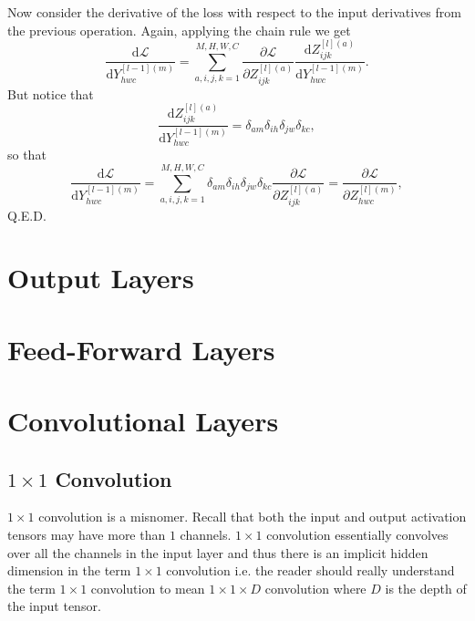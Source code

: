 \documentclass[modern]{aastex61}
\newcommand{\uderivative}{\mathrm{d}}
\begin{document}
Now consider the derivative of the loss with respect to the input derivatives from the previous operation. Again, applying the chain rule we get
\begin{equation*}
  \frac{\uderivative \mathscr{L}}{\uderivative Y^{[l-1](m)}_{hwc}} = \sum_{a,i,j,k = 1}^{M,H,W,C} \frac{\partial \mathscr{L}}{\partial Z^{[l](a)}_{ijk}} \frac{\uderivative  Z^{[l](a)}_{ijk}}{\uderivative Y^{[l-1](m)}_{hwc}}.
\end{equation*}
But notice that
\begin{equation*}
  \frac{\uderivative Z^{[l](a)}_{ijk}}{\uderivative Y^{[l-1](m)}_{hwc}} = \delta_{am}\delta_{ih}\delta_{jw}\delta_{kc},
\end{equation*}
so that
\begin{equation*}
  \frac{\uderivative \mathscr{L}}{\uderivative Y^{[l-1](m)}_{hwc}} = \sum_{a,i,j,k = 1}^{M,H,W,C} \delta_{am}\delta_{ih}\delta_{jw}\delta_{kc} \frac{\partial \mathscr{L}}{\partial  Z^{[l](a)}_{ijk}} = \frac{\partial \mathscr{L}}{\partial  Z^{[l](m)}_{hwc}},
\end{equation*}
Q.E.D.

\section{Output Layers} \label{sec:out}

\section{Feed-Forward Layers} \label{sec:ff}

\section{Convolutional Layers} \label{sec:conv}

\subsection{$1 \times 1$ Convolution} \label{sec:conv11}

$1 \times 1$ convolution is a misnomer. Recall that both the input and output activation tensors may have more than $1$ channels. $1 \times 1$ convolution essentially convolves over all the channels in the input layer and thus there is an implicit hidden dimension in the term $1 \times 1$ convolution i.e. the reader should really understand the term $1 \times 1$ convolution to mean $1 \times 1 \times D$ convolution where $D$ is the depth of the input tensor.
\end{document}
